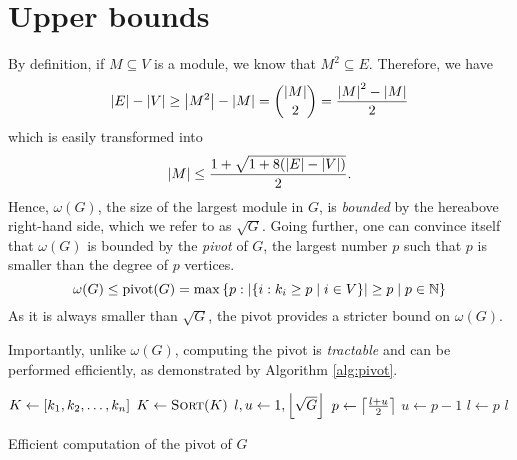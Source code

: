 \documentclass[a4paper, 12pt]{article}
\begin{document}
    \newpage
    
    \printbibliography
    
    \newpage
    
    \appendix
    
    \section{Upper bounds} \label{sec:Upper bounds}
    
    By definition, if $M \subseteq V$ is a module, we know that $M^2 \subseteq E$. Therefore, we have
    \begin{equation}
        \left|E\right| - \left|V\right| \geq \left|M^2\right| - \left|M\right| = \binom{\left|M\right|}{2} = \frac{\left|M\right|^2 - \left|M\right|}{2}
    \end{equation}
    which is easily transformed into
    \begin{equation} \label{eq:first-bound}
        \left|M\right| \leq \frac{1 + \sqrt{1 + 8 (\left|E\right| - \left|V\right|)}}{2} .
    \end{equation}
    Hence, $\omega(G)$, the size of the largest module in $G$, is \emph{bounded} by the hereabove right-hand side, which we refer to as $\sqrt{G}$.
    Going further, one can convince itself that $\omega(G)$ is bounded by the \emph{pivot} of $G$, \ie{} the largest number $p$ such that $p$ is smaller than the degree of $p$ vertices.
    \begin{equation}
        \omega(G) \leq \mathrm{pivot}(G) = \max \left\{p: \left|\left\{i: k_i \geq p \mid i \in V\right\}\right| \geq p \mid p \in \mathbb{N}\right\}
    \end{equation}
    As it is always smaller than $\sqrt{G}$, the pivot provides a stricter bound on $\omega(G)$.
    
    Importantly, unlike $\omega(G)$, computing the pivot is \emph{tractable} and can be performed efficiently, as demonstrated by Algorithm \ref{alg:pivot}.
    
    \begin{algorithm}[h]
        \begin{algorithmic}[1]
    				\State $K \gets \left[k_1, k_2, \dots, k_n\right]$ 
    				\State $K \gets \Call{Sort}{K}$ 
    				\State $l, u \gets 1, \left\lfloor\sqrt{G}\right\rfloor$
    				 
    					\State $p \gets \left\lceil\frac{l + u}{2}\right\rceil$
    					    \State $u \gets p - 1$
    					\Else
    					    \State $l \gets p$
    					\EndIf
    				\EndWhile
    				\State \Return $l$
    			\EndFunction
    		\end{algorithmic}
    		\caption{Efficient computation of the pivot of $G$}
		    \label{alg:pivot}
    \end{algorithm}
    
\end{document}
